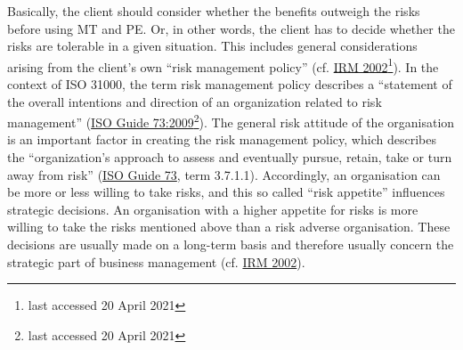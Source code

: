Basically, the client should consider whether the benefits outweigh the risks before using MT and PE. Or, in other words, the client has to decide whether the risks are tolerable in a given situation. This includes general considerations arising from the client’s own “risk management policy” (cf. \href{https://www.theirm.org/media/4709/arms_2002_irm.pdf}{IRM 2002}\footnote{last accessed 20 April 2021}). In the context of ISO 31000, the term risk management policy describes a “statement of the overall intentions and direction of an organization related to risk management” (\href{https://www.iso.org/standard/44651.html}{ISO Guide 73:2009}\footnote{last accessed 20 April 2021}). The general risk attitude of the organisation is an important factor in creating the risk management policy, which describes the “organization’s approach to assess and eventually pursue, retain, take or turn away from risk” (\href{https://www.iso.org/standard/44651.html}{ISO Guide 73}, term 3.7.1.1). Accordingly, an organisation can be more or less willing to take risks, and this so called “risk appetite” influences strategic decisions. An organisation with a higher appetite for risks is more willing to take the risks mentioned above than a risk adverse organisation. These decisions are usually made on a long-term basis and therefore usually concern the strategic part of business management (cf. \href{https://www.theirm.org/media/4709/arms_2002_irm.pdf}{IRM 2002}).

